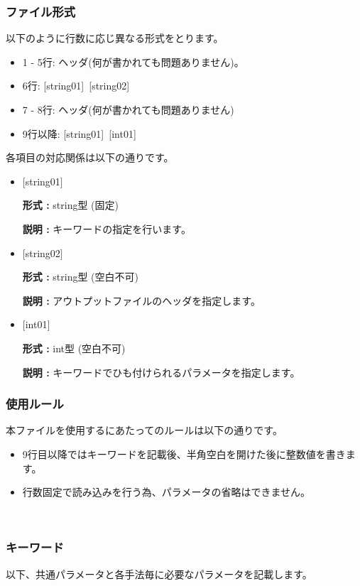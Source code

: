 \subsubsection{ファイル形式}
以下のように行数に応じ異なる形式をとります。
 \begin{itemize}
   \item  1 - 5行:  ヘッダ(何が書かれても問題ありません)。
   \item  6行:  [string01]~[string02]
   \item  7 - 8行: ヘッダ(何が書かれても問題ありません)
   \item  9行以降: [string01]~[int01]
  \end{itemize}
各項目の対応関係は以下の通りです。
\begin{itemize}
   \item  $[$string01$]$
   
   {\bf 形式 :} string型 (固定)

  {\bf 説明 :} キーワードの指定を行います。
   
   \item  $[$string02$]$
   
   {\bf 形式 :} string型 (空白不可)

  {\bf 説明 :} アウトプットファイルのヘッダを指定します。

   \item  $[$int01$]$
   
   {\bf 形式 :} int型 (空白不可)

  {\bf 説明 :} キーワードでひも付けられるパラメータを指定します。

  \end{itemize}

\subsubsection{使用ルール}
本ファイルを使用するにあたってのルールは以下の通りです。
\begin{itemize}
\item 9行目以降ではキーワードを記載後、半角空白を開けた後に整数値を書きます。
\item 行数固定で読み込みを行う為、パラメータの省略はできません。
\end{itemize}

~\subsubsection{キーワード}
以下、共通パラメータと各手法毎に必要なパラメータを記載します。

